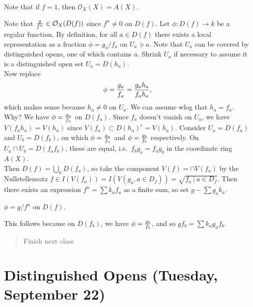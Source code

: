 Note that if \(f=1\), then \({\mathcal{O}}_X(X) = A(X)\).

\begin{proposition}[?]

Note that \({g\over f^n} \in {\mathcal{O}}_X(D(f))\) since \(f^n\neq 0\)
on \(D(f)\). Let \(\phi: D(f) \to k\) be a regular function. By
definition, for all \(a\in D(f)\) there exists a local representation as
a fraction \(\phi = g_a/f_a\) on \(U_a\ni a\). Note that \(U_a\) can be
covered by distinguished opens, one of which contains \(a\). Shrink
\(U_a\) if necessary to assume it is a distinguished open set
\(U_a = D(h_a)\).\\

Now replace
\begin{align*}  
\phi = {g_a \over f_a} = {g_a h_a \over f_a h_a}
,\end{align*}
which makes sense because \(h_a\neq 0\) on \(U_a\). We can assume wlog
that \(h_a = f_a\). Why? We have \(\phi = {g_a \over f_a}\) on
\(D(f_a)\). Since \(f_a\) doesn't vanish on \(U_a\), we have
\(V(f_a h_a) = V(h_a)\) since \(V(f_a) \subset D(h_a)^c = V(h_a)\).
Consider \(U_a = D(f_a)\) and \(U_b = D(f_b)\), on which
\(\phi = {g_a\over f_a}\) and \(\phi = {g_b \over f_b}\) respectively.
On \(U_a\cap U_b = D(f_a f_b)\), these are equal,
i.e.~\(f_b g_a = f_a g_b\) in the coordinate ring \(A(X)\).\\

Then \(D(f) = \bigcup_a D(f_a)\), so take the component
\(V(f) = \cap V(f_a)\) by the Nullstellensatz
\(f\in I(V(f_a)) = I(V(g_a, a\in D_f)) = \sqrt{f_a {~\mathrel{\Big|}~}a\in D_f}\).
Then there exists an expression \(f^n = \sum k_a f_a\) as a finite sum,
so set \(g - \sum g_a k_a\).

\begin{claim}

\(\phi = g/f^n\) on \(D(f)\).

\end{claim}

This follows because on \(D(f_b)\), we have \(\phi = {g_b \over f_b}\),
and so \(gf_b = \sum k_a g_a f_b\).

\begin{quote}
Finish next class
\end{quote}

\end{proposition}

\hypertarget{distinguished-opens-tuesday-september-22}{%
\section{Distinguished Opens (Tuesday, September
22)}\label{distinguished-opens-tuesday-september-22}}

